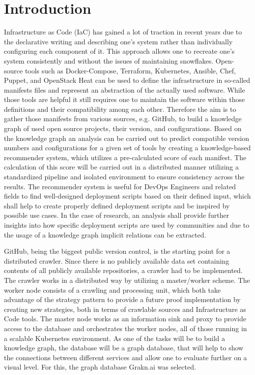 \chapter{Introduction}
Infrastructure as Code (IaC) has gained a lot of traction in recent years due to the declarative writing and describing one's system rather than individually configuring each component of it. This approach allows one to recreate one's system consistently and without the issues of maintaining snowflakes. Open-source tools such as Docker-Compose, Terraform, Kubernetes, Ansible, Chef, Puppet, and OpenStack Heat can be used to define the infrastructure in so-called manifests files and represent an abstraction of the actually used software. While those tools are helpful it still requires one to maintain the software within those definitions and their compatibility among each other.
Therefore the aim is to gather those manifests from various sources, e.g. GitHub, to build a knowledge graph of used open source projects, their version, and configurations. Based on the knowledge graph an analysis can be carried out to predict compatible version numbers and configurations for a given set of tools by creating a knowledge-based recommender system, which utilizes a pre-calculated score of each manifest. The calculation of this score will be carried out in a distributed manner utilizing a standardized pipeline and isolated environment to ensure consistency across the results.
The recommender system is useful for DevOps Engineers and related fields to find well-designed deployment scripts based on their defined input, which shall help to create properly defined deployment scripts and be inspired by possible use cases. In the case of research, an analysis shall provide further insights into how specific deployment scripts are used by communities and due to the usage of a knowledge graph implicit relations can be extracted.

GitHub, being the biggest public version control, is the starting point for a distributed crawler. Since there is no publicly available data set containing contents of all publicly available repositories, a crawler had to be implemented. The crawler works in a distributed way by utilizing a master/worker scheme. The worker node consists of a crawling and processing unit, which both take advantage of the strategy pattern to provide a future proof implementation by creating new strategies, both in terms of crawlable sources and Infrastructure as Code tools. The master node works as an information sink and proxy to provide access to the database and orchestrates the worker nodes, all of those running in a scalable Kubernetes environment.
As one of the tasks will be to build a knowledge graph, the database will be a graph database, that will help to show the connections between different services and allow one to evaluate further on a visual level. For this, the graph database Grakn.ai was selected.

